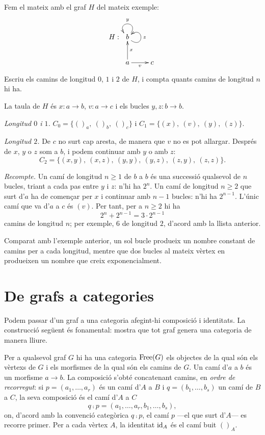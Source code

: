 \begin{exemple}\label{ex:grafs-camins-H}
Fem el mateix amb el graf $H$ del mateix exemple:
\[
H:\ 
\xymatrix{
	b \ar@(ur,ul)_{y} \ar@(dr,ur)_{z} \\
	a \ar[u]_{x} \ar[r]_{v} & c
}
\]
Escriu els camins de longitud $0$, $1$ i $2$ de $H$, i compta quants camins de longitud $n$ hi ha.
\end{exemple}
\begin{solucio}
La taula de $H$ és $x\colon a\to b$, $v\colon a\to c$ i els bucles $y,z\colon b\to b$.

\emph{Longitud $0$ i $1$.} $C_0=\{()_a,\ ()_b,\ ()_c\}$ i $C_1=\{(x),\ (v),\ (y),\ (z)\}$.

\emph{Longitud $2$.} De $c$ no surt cap aresta, de manera que $v$ no es pot allargar. Després de $x$, $y$ o $z$ som a $b$, i podem continuar amb $y$ o amb $z$:
\[
C_2=\{(x,y),\ (x,z),\ (y,y),\ (y,z),\ (z,y),\ (z,z)\}.
\]

\emph{Recompte.} Un camí de longitud $n\geq 1$ de $b$ a $b$ és una successió qualsevol de $n$ bucles, triant a cada pas entre $y$ i $z$: n'hi ha $2^n$. Un camí de longitud $n\geq 2$ que surt d'$a$ ha de començar per $x$ i continuar amb $n-1$ bucles: n'hi ha $2^{n-1}$. L'únic camí que va d'$a$ a $c$ és $(v)$. Per tant, per a $n\geq 2$ hi ha
\[
2^n+2^{n-1}=3\cdot 2^{n-1}
\]
camins de longitud $n$; per exemple, $6$ de longitud $2$, d'acord amb la llista anterior.

Comparat amb l'exemple anterior, un sol bucle produeix un nombre constant de camins per a cada longitud, mentre que dos bucles al mateix vèrtex en produeixen un nombre que creix exponencialment.
\end{solucio}

\section{De grafs a categories}

Podem passar d'un graf a una categoria afegint-hi composició i identitats. La construcció següent és fonamental: mostra que tot graf genera una categoria de manera lliure.

Per a qualsevol graf $G$ hi ha una categoria $\operatorname{Free}(G)$ els objectes de la qual són els vèrtexs de $G$ i els morfismes de la qual són els camins de $G$. Un camí d'$a$ a $b$ és un morfisme $a\to b$. La composició s'obté concatenant camins, en \emph{ordre de recorregut}: si $p=(a_1,\dots,a_r)$ és un camí d'$A$ a $B$ i $q=(b_1,\dots,b_s)$ un camí de $B$ a $C$, la seva composició és el camí d'$A$ a $C$
\[
q\comp p=(a_1,\dots,a_r,b_1,\dots,b_s),
\]
on, d'acord amb la convenció categòrica $q\comp p$, el camí $p$ ---el que surt d'$A$--- es recorre primer. Per a cada vèrtex $A$, la identitat $\operatorname{id}_A$ és el camí buit $()_A$.

